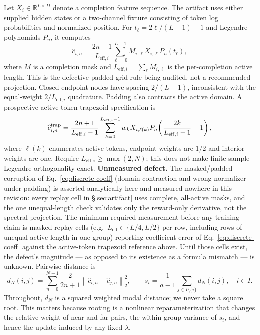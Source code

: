\documentclass{article}
\begin{document}
Let $X_i\in\mathbb{R}^{L\times D}$ denote a completion feature sequence.  The
artifact uses either supplied hidden states or a two-channel fixture consisting
of token log probabilities and normalized position.  For
$t_\ell=2\ell/(L-1)-1$ and Legendre polynomials $P_n$, it computes
\begin{equation}
  \widehat c_{i,n}
  = \frac{2n+1}{L_{\mathrm{eff},i}}
    \sum_{\ell=0}^{L-1} M_{i,\ell}X_{i,\ell}P_n(t_\ell),
  \label{eq:discrete-coeff}
\end{equation}
where $M$ is a completion mask and
$L_{\mathrm{eff},i}=\sum_\ell M_{i,\ell}$ is the per-completion active
length.
This is the defective padded-grid rule being audited, not a recommended
projection. Closed endpoint nodes have spacing $2/(L-1)$, inconsistent with
the equal-weight $2/L_{\mathrm{eff},i}$ quadrature. Padding also contracts
the active domain. A prospective active-token trapezoid specification is
\[
\widehat c^{\rm trap}_{i,n}=\frac{2n+1}{L_{\mathrm{eff},i}-1}
\sum_{k=0}^{L_{\mathrm{eff},i}-1}w_kX_{i,\ell(k)}
P_n\!\left(\frac{2k}{L_{\mathrm{eff},i}-1}-1\right),
\]
where $\ell(k)$ enumerates active tokens, endpoint weights are $1/2$ and
interior weights are one. Require $L_{\mathrm{eff},i}\ge\max(2,N)$;
this does not make finite-sample Legendre orthogonality exact.
\textbf{Unmeasured defect.} The masked/padded corruption of
Eq.~\eqref{eq:discrete-coeff} (domain contraction and wrong normalizer
under padding) is asserted analytically here and measured nowhere in this
revision: every replay cell in \S\ref{sec:artifact} uses complete, all-active masks, and
the one unequal-length check validates only the reward-only derivative,
not the spectral projection. The minimum required measurement before any
training claim is masked replay cells (e.g.\ $L_{\mathrm{eff}}\in\{L/4,L/2\}$
per row, including rows of unequal active length in one group) reporting
coefficient error of Eq.~\eqref{eq:discrete-coeff} against the
active-token trapezoid reference above. Until those cells exist, the
defect's magnitude --- as opposed to its existence as a formula mismatch
--- is unknown.
Pairwise distance is
\begin{equation}
  d_N(i,j)=\sum_{n=0}^{N-1}
  \frac{2}{2n+1}\left\|\widehat c_{i,n}-\widehat c_{j,n}\right\|_2^2,
  \qquad
  s_i=\frac{1}{a-1}\sum_{j\in I\setminus\{i\}}d_N(i,j),\quad i\in I.
\end{equation}
Throughout, $d_N$ is a squared weighted modal distance; we never take a square
root.  This matters because rooting is a nonlinear reparameterization that
changes the relative weight of near and far pairs, the within-group variance of
$s_i$, and hence the update induced by any fixed $\lambda$.
\end{document}
